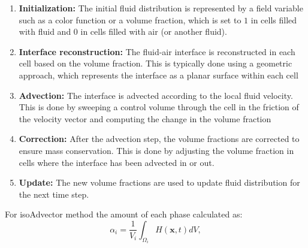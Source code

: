 \begin{enumerate}
\item \textbf {Initialization:} The initial fluid distribution is represented by a field variable such as a color function or a volume fraction, which is set to $1$ in cells filled with fluid and $0$ in cells filled with air (or another fluid).
\item \textbf {Interface reconstruction:} The fluid-air interface is reconstructed in each cell based on the volume fraction. This is typically done using a geometric approach, which represents the interface as a planar surface within each cell
\item \textbf {Advection:} The interface is advected according to the local fluid velocity. This is done by sweeping a control volume through the cell in the friction of the velocity vector and computing the change in the volume fraction
\item \textbf {Correction:} After the advection step, the volume fractions are corrected to ensure mass conservation. This is done by adjusting the volume fraction in cells where the interface has been advected in or out.
\item \textbf {Update:} The new volume fractions are used to update fluid distribution for the next time step.
\end{enumerate}
For isoAdvector method the amount of each phase calculated as:
\begin{equation}
    \alpha_{i}=\frac{1}{V_{i}} \int_{\Omega_{i}} H(\boldsymbol{x}, t) d V,
\end{equation}
